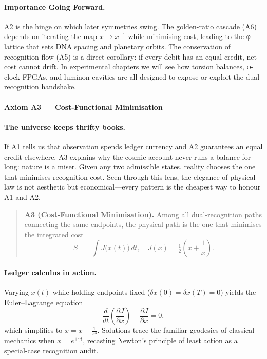 \documentclass[11pt,oneside]{book}
\begin{document}
\paragraph*{Importance Going Forward.}
A2 is the hinge on which later symmetries swing.  The golden-ratio
cascade (A6) depends on iterating the map \(x\!\to\!x^{-1}\) while
minimising cost, leading to the φ-lattice that sets DNA spacing and
planetary orbits.  
The conservation of recognition flow (A5) is a direct corollary: if
every debit has an equal credit, net cost cannot drift.
In experimental chapters we will see how torsion balances, φ-clock
FPGAs, and luminon cavities are all designed to expose or exploit the
dual-recognition handshake.

\bigskip

\paragraph{Axiom A3 — Cost-Functional Minimisation}
\label{ssec:axiom-A3}

\paragraph*{The universe keeps thrifty books.}
If A1 tells us that observation spends ledger currency and A2 guarantees
an equal credit elsewhere, A3 explains why the cosmic account never runs
a balance for long: nature is a miser.  Given any two admissible states,
reality chooses the one that minimises recognition cost.  Seen through
this lens, the elegance of physical law is not aesthetic but
economical—every pattern is the cheapest way to honour A1 and A2.

\begin{quote}
\textbf{A3 (Cost-Functional Minimisation).}  
Among all dual-recognition paths connecting the same endpoints, the
physical path is the one that minimises the integrated cost
\[
  S
  \;=\;
  \int\! J\bigl(x(t)\bigr)\,dt,
  \quad J(x)=\tfrac12\!\left(x+\frac1x\right).
\]
\end{quote}

\paragraph*{Ledger calculus in action.}
Varying \(x(t)\) while holding endpoints fixed
(\(\delta x(0)=\delta x(T)=0\)) yields the Euler–Lagrange equation
\[
  \frac{d}{dt}\left(
    \frac{\partial J}{\partial \dot{x}}
  \right) - 
  \frac{\partial J}{\partial x}
  = 0,
\]
which simplifies to
\(\ddot{x}=x-\frac1{x^{3}}\).
Solutions trace the familiar geodesics of
classical mechanics when \(x=e^{\pm \gamma t}\),  
recasting Newton’s principle of least action as a special-case
recognition audit.
\end{document}
